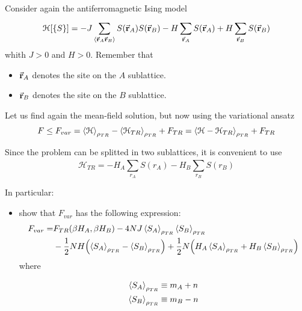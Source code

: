 \documentclass[../main/main.tex]{subfiles}
\begin{document}
\begin{exercise}{}{}
Consider again the antiferromagnetic Ising model
\begin{equation*}
  \mathcal{H}[\{ S \}  ] = - J \sum_{\expval{\va{r}_A \va{r}_B} }^{} S (\va{r}_A) S(\va{r}_B) - H \sum_{\va{r}_A}^{} S (\va{r}_A) + H \sum_{\va{r}_B}^{} S (\va{r}_B)
\end{equation*}
whith \( J>0 \) and \( H>0 \). Remember that
\begin{itemize}
\item \( \va{r}_A \) denotes the site on the \( A \) sublattice.
\item \( \va{r}_B \) denotes the site on the \( B \) sublattice.
\end{itemize}

Let us find again the mean-field solution, but now using the variational ansatz
\begin{equation*}
  F \le F_{var} = \expval{\mathcal{H}}_{\rho _{TR}} - \expval{\mathcal{H}_{TR} }_{\rho _{TR}}  + F_{TR} = \expval{\mathcal{H} - \mathcal{H}_{TR}}_{\rho _{TR}} + F_{TR}
\end{equation*}
\begin{remark}
  Since the problem can be splitted in two sublattices, it is convenient to use
  \begin{equation*}
    \mathcal{H}_{TR} = - H_A \sum_{r_A}^{} S(r_A) - H_B \sum_{r_B}^{}  S(r_B)
  \end{equation*}
\end{remark}
In particular:
\begin{itemize}
\item show that \( F_{var} \) has the following expression:
\begin{equation*}
\begin{split}
F_{var}  = &  F_{TR} (\beta H_A, \beta H_B)
- 4 NJ \expval{S_A}_{\rho _{TR}}  \expval{S_B}_{\rho _{TR}} \\
 &- \frac{1}{2} NH \qty(\expval{S_A}_{\rho _{TR}}
 - \expval{S_B}_{\rho _{TR}}   )
 + \frac{1}{2} N \qty(H_A \expval{S_A}_{\rho _{TR}}  + H_B \expval{S_B}_{\rho _{TR}}   )
\end{split}
\end{equation*}
where
\begin{subequations*}
\begin{align*}
   \expval{S_A}_{\rho _{TR}}  & \equiv m_A + n \\
    \expval{S_B}_{\rho _{TR}}  & \equiv m_B - n
\end{align*}
\end{subequations*}

\end{itemize}
\end{exercise}
\end{document}
